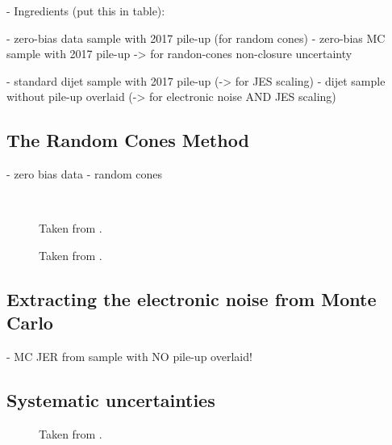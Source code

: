 - Ingredients (put this in table):

- zero-bias data sample with 2017 pile-up (for random cones)
- zero-bias MC sample with 2017 pile-up -> for randon-cones non-closure uncertainty

- standard dijet sample with 2017 pile-up (-> for JES scaling)
- dijet sample without pile-up overlaid  (-> for electronic noise AND JES scaling)





\subsection{The Random Cones Method}

- zero bias data
- random cones

\begin{figure}
     \\
    \caption{Taken from .}
    \label{fig:const-scale-noise}
\end{figure}


\begin{figure}
    \caption{Taken from .}
    \label{fig:pile-up-jer-vs-pt}
\end{figure}


\subsection{Extracting the electronic noise from Monte Carlo}
- MC JER from sample with NO pile-up overlaid!


\subsection{Systematic uncertainties}


\begin{figure}
    \caption{Taken from .}
    \label{fig:non-closure}
\end{figure}


